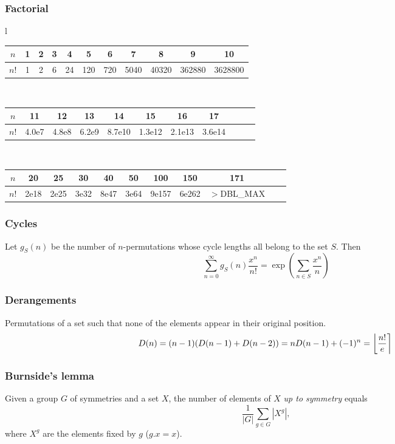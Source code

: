   \subsubsection{Factorial}
    \begin{center}
\begin{tabular}{l}
\begin{tabular}{c|c@{\ }c@{\ }c@{\ }c@{\ }c@{\ }c@{\ }c@{\ }c@{\ }c@{\ }c}
$n$  & 1 & 2 & 3 & 4  & 5   & 6   & 7    & 8     & 9      & 10\\
\hline
$n!$ & 1 & 2 & 6 & 24 & 120 & 720 & 5040 & 40320 & 362880 & 3628800\\
\end{tabular}\\
\begin{tabular}{c|c@{\ }c@{\ }c@{\ }c@{\ }c@{\ }c@{\ }c@{\ }c@{\ }c@{\ }c}
$n$  & 11    & 12    & 13    & 14     & 15     & 16     & 17\\
\hline
$n!$ & 4.0e7 & 4.8e8 & 6.2e9 & 8.7e10 & 1.3e12 & 2.1e13 & 3.6e14\\
\end{tabular}\\
\begin{tabular}{c|c@{\ }c@{\ }c@{\ }c@{\ }c@{\ }c@{\ }c@{\ }c@{\ }c@{\ }c}
$n$  & 20   & 25   & 30   & 40   & 50   & 100   & 150   & 171\\
\hline
$n!$ & 2e18 & 2e25 & 3e32 & 8e47 & 3e64 & 9e157 & 6e262 & \scriptsize{$>$DBL\_MAX}\\
\end{tabular}
\end{tabular}
\end{center}


  \subsubsection{Cycles}
    Let $g_S(n)$ be the number of $n$-permutations whose cycle lengths all belong to the set $S$. Then
    $$\sum_{n=0} ^\infty g_S(n) \frac{x^n}{n!} = \exp\left(\sum_{n\in S} \frac{x^n} {n} \right)$$

  \subsubsection{Derangements}
    Permutations of a set such that none of the elements appear in their original position.
    \[ \mkern-2mu D(n) = (n-1)(D(n-1)+D(n-2)) = n D(n-1)+(-1)^n = \left\lfloor\frac{n!}{e}\right\rceil \]

  \subsubsection{Burnside's lemma}
    Given a group $G$ of symmetries and a set $X$, the number of elements of $X$ \emph{up to symmetry} equals
     \[ {\frac {1}{|G|}}\sum _{{g\in G}}|X^{g}|, \]
     where $X^{g}$ are the elements fixed by $g$ ($g.x = x$).

